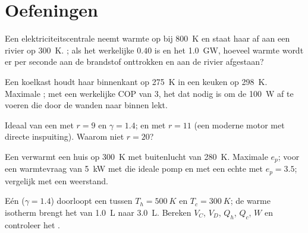 \section{Oefeningen}

\begin{exercise}[$\star$]\label{exo:b1:heat-engines:1}
Een elektriciteitscentrale neemt warmte op bij \qty{800}{K} en staat haar af aan een rivier op
\qty{300}{K}. ; als het werkelijke  $0.40$ is en het
 \qty{1.0}{GW}, hoeveel warmte wordt er per seconde aan de brandstof onttrokken
en aan de rivier afgestaan?
\end{exercise}

\begin{exercise}[$\star$]\label{exo:b1:heat-engines:2}
Een koelkast houdt haar binnenkant op \qty{275}{K} in een keuken op
\qty{298}{K}. Maximale ; met een werkelijke COP van $3$,
het  dat nodig is om de \qty{100}{W} af te voeren die door
de wanden naar binnen lekt.
\end{exercise}

\begin{exercise}[$\star$]\label{exo:b1:heat-engines:3}
Ideaal  van een  met $r = 9$ en $\gamma = 1.4$; en met
$r = 11$ (een moderne motor met directe inspuiting). Waarom niet $r = 20$?
\end{exercise}

\begin{exercise}[$\star$]\label{exo:b1:heat-engines:4}
Een  verwarmt een huis op \qty{300}{K} met buitenlucht van \qty{280}{K}.
Maximale $e_p$;  voor een warmtevraag van \qty{5}{kW} met
die ideale pomp en met een echte met $e_p = 3.5$; vergelijk met een
weerstand.
\end{exercise}

\begin{exercise}[$\star\star$]\label{exo:b1:heat-engines:5}
Eén   ($\gamma = 1.4$) doorloopt een  tussen
$T_h = \qty{500}{K}$ en $T_c = \qty{300}{K}$; de warme isotherm brengt het van
\qty{1.0}{L} naar \qty{3.0}{L}. Bereken $V_C$, $V_D$, $Q_h$, $Q_c$, $W$ en
controleer het .
\end{exercise}

